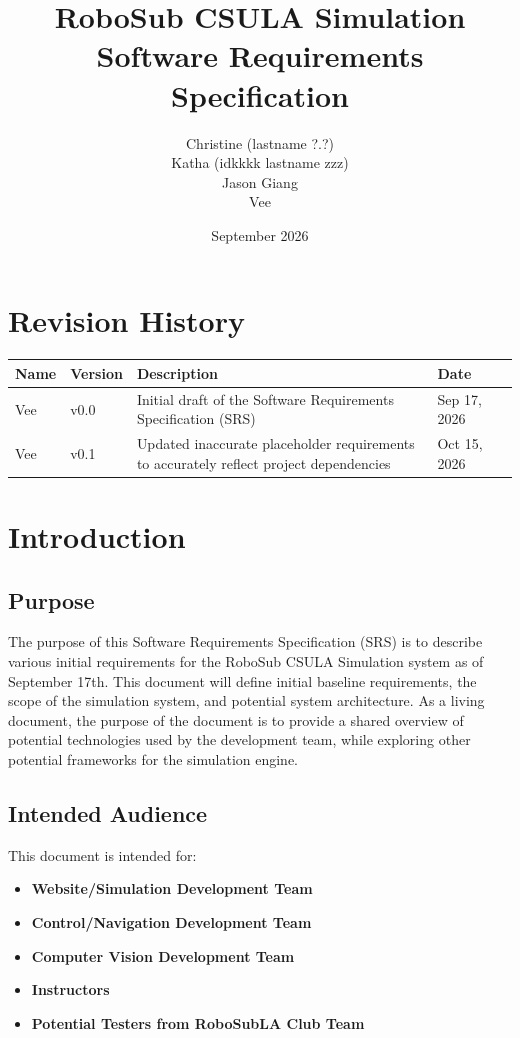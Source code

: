 \documentclass[12pt]{article}
\title{RoboSub CSULA Simulation\\
Software Requirements Specification}
\author{
	Christine (lastname ?.?)\\
	Katha (idkkkk  lastname zzz)\\
	Jason Giang\\
	Vee\\
	}
\date{September 2026}
\begin{document}
 

\begin{titlepage} 
\maketitle
\thispagestyle{empty} 
\end{titlepage} 

\thispagestyle{empty} 
\tableofcontents
\newpage 

\section*{Revision History} 
\begin{center} 
\begin{tabular}{|p{3cm}|p{3cm}|p{3cm}|p{3cm}|p{3cm}|}
\hline
\textbf{Name} & \textbf{Version} & \textbf{Description} & \textbf{Date}\\ 
\hline
Vee & v0.0 & Initial draft of the Software Requirements Specification (SRS) & Sep 17, 2026\\
Vee & v0.1 & Updated inaccurate placeholder requirements to accurately reflect project dependencies & Oct 15, 2026\\
\hline 

\end{tabular}
\end{center} 

\newpage 
\section{Introduction} 

\subsection{Purpose} 
The purpose of this Software Requirements Specification (SRS) is to describe various initial requirements for the RoboSub CSULA Simulation system as of September 17th. This document will define initial baseline requirements, the scope of the simulation system, and potential system architecture. As a living document, the purpose of the document is to provide a shared overview of potential technologies used by the development team, while exploring other potential frameworks for the simulation engine. 

\subsection{Intended Audience} 
This document is intended for: 
\begin{itemize} 
	\item \textbf{Website/Simulation Development Team}
	\item \textbf{Control/Navigation Development Team} 
	\item \textbf{Computer Vision Development Team} 
	\item \textbf{Instructors} 
	\item \textbf{Potential Testers from RoboSubLA Club Team} 
\end{itemize} 
\end{document}
